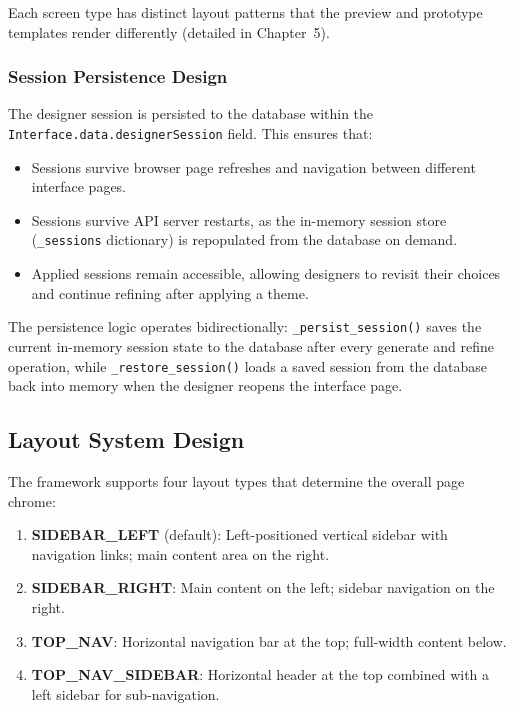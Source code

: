 Each screen type has distinct layout patterns that the preview and prototype templates render differently (detailed in Chapter~5).


\subsubsection{Session Persistence Design}

The designer session is persisted to the database within the \texttt{Interface.data.designerSession} field. This ensures that:

\begin{itemize}
    \item Sessions survive browser page refreshes and navigation between different interface pages.
    \item Sessions survive API server restarts, as the in-memory session store (\texttt{\_sessions} dictionary) is repopulated from the database on demand.
    \item Applied sessions remain accessible, allowing designers to revisit their choices and continue refining after applying a theme.
\end{itemize}

The persistence logic operates bidirectionally: \texttt{\_persist\_session()} saves the current in-memory session state to the database after every generate and refine operation, while \texttt{\_restore\_session()} loads a saved session from the database back into memory when the designer reopens the interface page.


\subsection{Layout System Design}

The framework supports four layout types that determine the overall page chrome:

\begin{enumerate}
    \item \textbf{SIDEBAR\_LEFT} (default): Left-positioned vertical sidebar with navigation links; main content area on the right.
    \item \textbf{SIDEBAR\_RIGHT}: Main content on the left; sidebar navigation on the right.
    \item \textbf{TOP\_NAV}: Horizontal navigation bar at the top; full-width content below.
    \item \textbf{TOP\_NAV\_SIDEBAR}: Horizontal header at the top combined with a left sidebar for sub-navigation.
\end{enumerate}

